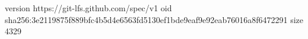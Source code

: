 version https://git-lfs.github.com/spec/v1
oid sha256:3e2119875f889bfc4b5d4e6563fd5130ef1bde9eaf9e92eab76016a8f6472291
size 4329
